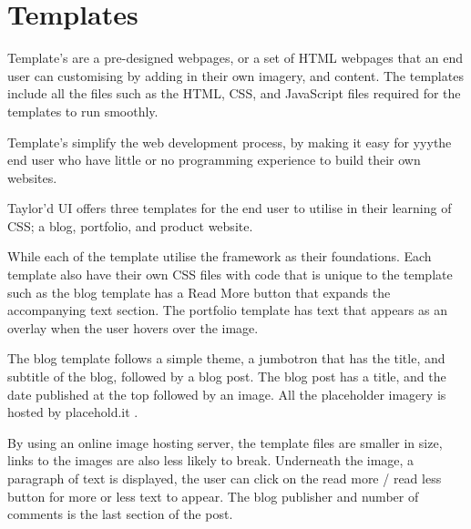 \newpage
\chapter*{Templates}


Template's are a pre-designed webpages, or a set of \gls{HTML} webpages that an end user can customising by adding in their own imagery, and content. The templates include all the files such as the \gls{HTML}, \gls{CSS}, and JavaScript files required for the templates to run smoothly. 

Template's simplify the web development process, by making it easy for yyythe end user who have little or no programming experience to build their own websites.

Taylor'd UI offers three templates for the end user to utilise in their learning of \gls{CSS}; a blog, portfolio, and product website. 

While each of the template utilise the framework as their foundations. Each template also have their own \gls{CSS} files with code that is unique to the template such as the blog template has a Read More button that expands the accompanying text section. The portfolio template has text that appears as an overlay when the user hovers over the image.

The blog template follows a simple theme, a jumbotron that has the title, and subtitle of the blog, followed by a blog post. The blog post has a title, and the date published at the top followed by an image. All the placeholder imagery is hosted by placehold.it \citep{PHI17}. 

By using an online image hosting server, the template files are smaller in size, links to the images are also less likely to break. Underneath the image, a paragraph of text is displayed, the user can click on the read more / read less button for more or less text to appear. The blog publisher and number of comments is the last section of the post. 